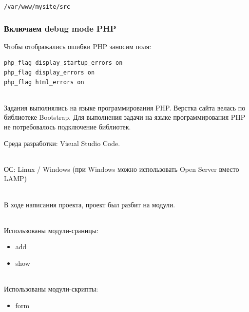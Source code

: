 \begin{verbatim}
/var/www/mysite/src
\end{verbatim}

\subsubsection{Включаем debug mode PHP}

Чтобы отображались ошибки PHP заносим поля:

\begin{verbatim}
php_flag display_startup_errors on
php_flag display_errors on
php_flag html_errors on
\end{verbatim}

\hspace{0pt}\\

Задания выполнялись на языке программирования PHP. Верстка сайта велась по библиотеке Bootstrap. Для выполнения задачи на языке программирования PHP не потребовалось подключение библиотек. 

\hspace{0pt}

Среда разработки: Visual Studio Code.

\hspace{0pt}\\

ОС: Linux / Windows (при Windows можно использовать Open Server вместо LAMP)

\hspace{0pt}\\

В ходе написания проекта, проект был разбит на модули.

\hspace{0pt}\\

Использованы модули-сраницы: 

\begin{itemize}
    \item add
    \item show
\end{itemize}

\hspace{0pt}\\

Использованы модули-скрипты: 

\begin{itemize}
    \item form
\end{itemize}

